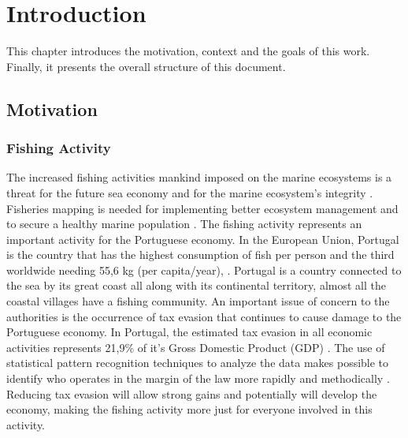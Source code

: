 

% 
% 
%
\chapter{Introduction}
\label{cha:introduction}
This chapter introduces the motivation, context and the goals of this work. Finally, it presents the overall structure of this document.

\section{Motivation} %
\label{sec:motivation}

\subsection{Fishing Activity} %
\label{sub:fishing_activity}
The increased fishing activities mankind imposed on the marine ecosystems is a threat for the future sea economy and for the marine ecosystem's integrity \cite{AgardyEffects}.\\
Fisheries mapping is needed for implementing better ecosystem management and to secure a healthy marine population \cite{AlfredImperative}.
The fishing activity represents an important activity for the Portuguese economy. In the European Union, Portugal is the country that has the highest consumption of fish per person and the third worldwide needing 55,6 kg (per capita/year), \cite{WEBSITE:ConsumoPescasPortugal}. Portugal is a country connected to the sea by its great coast all along with its continental territory, almost all the coastal villages have a fishing community.
An important issue of concern to the authorities is the occurrence of tax evasion that continues to cause damage to the Portuguese economy. In Portugal, the estimated tax evasion in all economic activities represents 21,9\% of it's Gross Domestic Product (GDP) \cite{BOOK:EsbocoFraude}.
The use of statistical pattern recognition techniques to analyze the data makes possible to identify who operates in the margin of the law more rapidly and methodically \cite{ShuklaBigData}. Reducing tax evasion will allow strong gains and potentially will develop the economy, making the fishing activity more just for everyone involved in this activity.

